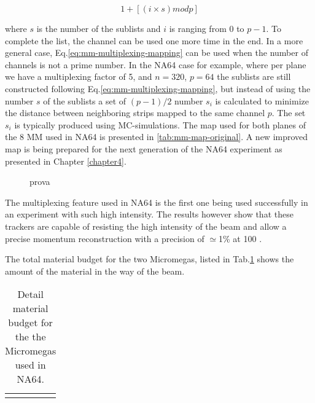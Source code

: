 \begin{equation}
\label{eq:mm-multiplexing-mapping}
1 + [(i \times s) mod p]
\end{equation}

where $s$ is the number of the sublists and $i$ is ranging from 0 to $p-1$. To complete the list, the channel can be used one more time in the end. In a more general case, Eq.\ref{eq:mm-multiplexing-mapping} can be used when the number of channels is not a prime number. In the NA64 case for example, where per plane we have a multiplexing factor of 5, and $n=320$, $p=64$ the sublists are still constructed following Eq.\ref{eq:mm-multiplexing-mapping}, but instead of using the number $s$ of the sublists a set of $(p-1)/2$ number $s_i$ is calculated to minimize the distance between neighboring strips mapped to the same channel $p$. The set $s_i$ is typically produced using MC-simulations. The map used for both planes of the 8 MM used in NA64 is presented in \ref{tab:mm-map-original}. A new improved map is being prepared for the next generation of the NA64 experiment as presented in Chapter \ref{chapter4}.

\begin{figure}[bth!]
\centering
\caption[example of the readout of a multiplexing detector]{prova}
\label{fig:multiplexing-example}
\end{figure}

The multiplexing feature used in NA64 is the first one being used successfully in an experiment with such high intensity. The results however show that these trackers are capable of resisting the high intensity of the beam and allow a precise momentum reconstruction with a precision of $\simeq$1\% at 100 \si{\gev} \cite{Banerjee:2017mdu}.

The total material budget for the two Micromegas, listed in Tab.\ref{tab:mm-mbudget} shows the amount of the material in the way of the beam. 

\begin{table}[bth!]
\centering
\begin{tabular}{|l|c|c|}
&&
\end{tabular}
\caption[material budget MM]{Detail material budget for the the Micromegas used in NA64.}
\label{tab:mm-mbudget}
\end{table}

